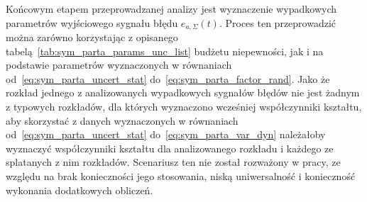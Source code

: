 Końcowym etapem przeprowadzanej analizy jest wyznaczenie wypadkowych parametrów wyjściowego sygnału błędu $e_{a,\Sigma}(t)$. Proces ten przeprowadzić można zarówno korzystając z opisanego tabelą~\ref{tab:sym_parta_params_unc_list} budżetu niepewności, jak i na podstawie parametrów wyznaczonych w równaniach od~\eqref{eq:sym_parta_uncert_stat} do~\eqref{eq:sym_parta_factor_rand}. Jako że rozkład jednego z analizowanych wypadkowych sygnałów błędów nie jest żadnym z typowych rozkładów, dla których wyznaczono wcześniej współczynniki kształtu, aby skorzystać z danych wyznaczonych w równaniach od~\eqref{eq:sym_parta_uncert_stat} do~\eqref{eq:sym_parta_var_dyn} należałoby wyznaczyć współczynniki kształtu dla analizowanego rozkładu i każdego ze splatanych z nim rozkładów. Scenariusz ten nie został rozważony w pracy, ze względu na brak konieczności jego stosowania, niską uniwersalność i konieczność wykonania dodatkowych obliczeń.

